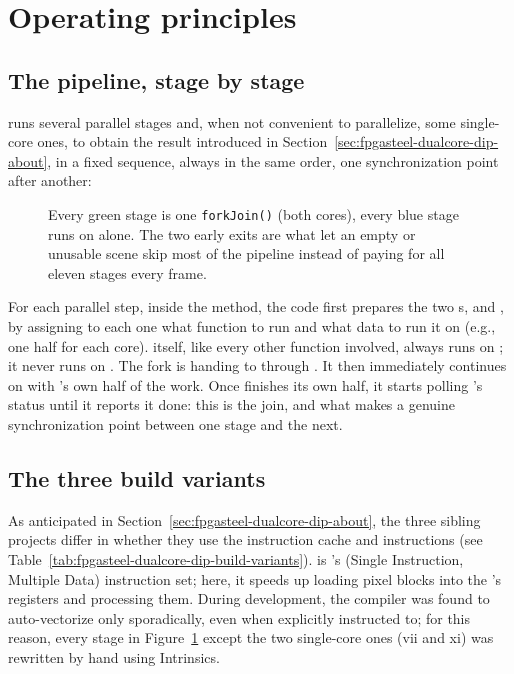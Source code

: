 \section{Operating principles}
\label{sec:fpgasteel-dualcore-dip-operating-principles}

\subsection{The pipeline, stage by stage}
\label{subsec:fpgasteel-dualcore-dip-pipeline}

 runs several parallel stages and, when not convenient to parallelize, some single-core ones, to obtain the result introduced in Section~\ref{sec:fpgasteel-dualcore-dip-about}, in a fixed sequence, always in the same order, one synchronization point after another:

\begin{figure}[htbp]
 \centering
 
 \caption{Every green stage is one \texttt{forkJoin()} (both cores), every blue stage runs on  alone. The two early exits are what let an empty or unusable scene skip most of the pipeline instead of paying for all eleven stages every frame.}
 \label{fig:fpgasteel-dualcore-dip-pipeline}
\end{figure}

For each parallel step, inside the  method, the code first prepares the two s,  and , by assigning to each one what function to run and what data to run it on (e.g., one half for each core).  itself, like every other function involved, always runs on ; it never runs on . The fork is  handing  to  through . It then immediately continues on  with 's own half of the work. Once  finishes its own half, it starts polling 's status until it reports it done: this is the join, and what makes  a genuine synchronization point between one stage and the next.

\subsection{The three build variants}
\label{subsec:fpgasteel-dualcore-dip-build-variants}

As anticipated in Section~\ref{sec:fpgasteel-dualcore-dip-about}, the three sibling projects differ in whether they use the instruction cache and  instructions (see Table~\ref{tab:fpgasteel-dualcore-dip-build-variants}).  is 's  (Single Instruction, Multiple Data) instruction set; here, it speeds up loading pixel blocks into the 's registers and processing them. During development, the compiler was found to auto-vectorize only sporadically, even when explicitly instructed to; for this reason, every stage in Figure~\ref{fig:fpgasteel-dualcore-dip-pipeline} except the two single-core ones (vii and xi) was rewritten by hand using  Intrinsics.

